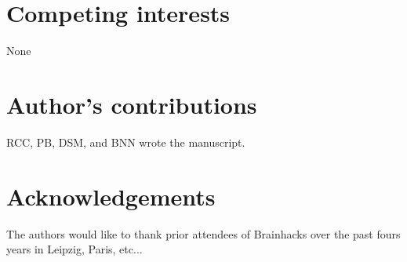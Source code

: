 \documentclass[11pt]{bmc_article_s50}
\begin{document}
\section*{Competing interests}
None

\section*{Author's contributions}
RCC, PB, DSM, and BNN wrote the manuscript.

\section*{Acknowledgements}
The authors would like to thank prior attendees of Brainhacks over the past fours years in Leipzig, Paris, etc... 






  

\end{document}
